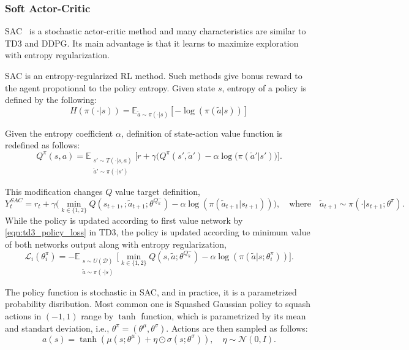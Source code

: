 \subsubsection{Soft Actor-Critic}
SAC~\cite{haarnoja_soft_2018} is a stochastic actor-critic method and many characteristics are similar to TD3 and DDPG. Its main advantage is that it learns to maximize exploration with entropy regularization. 

SAC is an entropy-regularized RL method. Such methods give bonus reward to the agent propotional to the policy entropy. Given state $s$, entropy of a policy is defined by the following: 
\begin{equation}
\label{eqn:policy_entropy}
H(\pi(\cdot|s)) = \mathbb{E}_{\widetilde{a}\sim\pi(\cdot|s)}[-\log(\pi(\widetilde{a}|s))]
\end{equation}

Given the entropy coefficient $\alpha$, definition of state-action value function is redefined as follows: 
\begin{equation}
\label{eqn:q_dfn_entreg}
Q^{\pi}(s,a) = \mathbb{E}_{\substack{s'\sim T(\cdot|s,a)\\\widetilde{a}'\sim \pi(\cdot|s')} } \Big[r + \gamma \Big(Q^{\pi}(s',\widetilde{a}') -\alpha\log(\pi(\widetilde{a}'|s') \Big) \Big]. %
\end{equation}

This modification changes $Q$ value target definition,
\begin{equation}
\label{eqn:q_target_sac}
Y_t^{SAC} = r_t + \gamma \Big(\min_{k\in\{1,2\}} Q(s_{t+1}, ;\widetilde{a}_{t+1};\theta^{Q_k^-}) -\alpha\log(\pi(\widetilde{a}_{t+1}|s_{t+1})) \Big), \quad \text{where} \quad \widetilde{a}_{t+1} \sim \pi(\cdot|s_{t+1}; \theta^{\pi}).
\end{equation}
While the policy is updated according to first value network by \eqref{eqn:td3_policy_loss} in TD3, the policy is updated according to minimum value of both networks output along with entropy regularization, 
\begin{equation}
\label{eqn:sac_policy_loss}
\mathcal{L}_i(\theta^\pi_i) = - \mathbb{E}_{\substack{s \sim U(\mathcal{D})\\\widetilde{a} \sim \pi(\cdot|s)}} \Big[ \min_{k\in\{1,2\}} Q(s, \widetilde{a};\theta^{Q_k^-}) - \alpha\log(\pi(\widetilde{a}|s;\theta^\pi_i)) \Big].
\end{equation}

The policy function is stochastic in SAC, and in practice, it is a parametrized probability disribution. Most common one is 
Squashed Gaussian policy to squash actions in $(-1,1)$ range by $\tanh$ function, which is parametrized by its mean and standart deviation, i.e., $\theta^{\pi}=(\theta^{\mu}, \theta^{\sigma})$. Actions are then sampled as follows: 
\begin{equation}
\label{eqn:squashed_gp_sampling}
a(s) = \tanh(\mu(s; \theta^{\mu}) + \eta \odot \sigma(s; \theta^{\sigma})), \quad \eta \sim \mathcal{N}(0, I). 
\end{equation}

